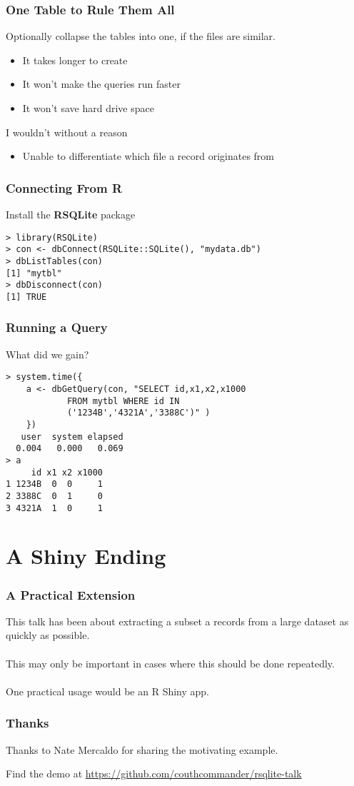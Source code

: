 \documentclass{beamer}
\begin{document}
\begin{frame}[fragile=singleslide]
\frametitle{One Table to Rule Them All}
Optionally collapse the tables into one, if the files are similar.
    \begin{itemize}
    \item It takes longer to create
    \item It won't make the queries run faster
    \item It won't save hard drive space
    \end{itemize}
I wouldn't without a reason
    \begin{itemize}
    \item Unable to differentiate which file a record originates from
    \end{itemize}
\end{frame}

\begin{frame}[fragile=singleslide]
\frametitle{Connecting From R}
Install the \textbf{RSQLite} package
\begin{verbatim}
> library(RSQLite)
> con <- dbConnect(RSQLite::SQLite(), "mydata.db")
> dbListTables(con)
[1] "mytbl"
> dbDisconnect(con)
[1] TRUE
\end{verbatim}
\end{frame}

\begin{frame}[fragile=singleslide]
\frametitle{Running a Query}
What did we gain?
\begin{verbatim}
> system.time({
    a <- dbGetQuery(con, "SELECT id,x1,x2,x1000
            FROM mytbl WHERE id IN 
            ('1234B','4321A','3388C')" )
    })
   user  system elapsed 
  0.004   0.000   0.069 
> a
     id x1 x2 x1000
1 1234B  0  0     1
2 3388C  0  1     0
3 4321A  1  0     1
\end{verbatim}
\end{frame}

\section{A Shiny Ending}
\begin{frame}
\frametitle{A Practical Extension}
This talk has been about extracting a subset a records from a large dataset as quickly as possible.\\~\\
This may only be important in cases where this should be done repeatedly.\\~\\
One practical usage would be an R Shiny app.
\end{frame}

\begin{frame}
\frametitle{Thanks}
Thanks to Nate Mercaldo for sharing the motivating example.

Find the demo at \url{https://github.com/couthcommander/rsqlite-talk}
\end{frame}
\end{document}

